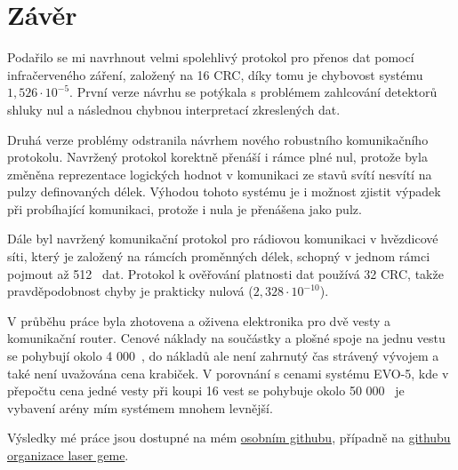 \chapter{Závěr}

Podařilo se mi navrhnout velmi spolehlivý protokol pro přenos dat pomocí infračerveného záření, založený na 16 CRC, díky tomu je chybovost systému $1,526 \cdot 10^{-5}$. První verze návrhu se potýkala s problémem zahlcování detektorů shluky nul a následnou chybnou interpretací zkreslených dat.

Druhá verze problémy odstranila návrhem nového robustního komunikačního protokolu. Navržený protokol korektně přenáší i rámce plné nul, protože byla změněna reprezentace logických hodnot v komunikaci ze stavů svítí nesvítí na pulzy definovaných délek. Výhodou tohoto systému je i možnost zjistit výpadek při probíhající komunikaci, protože i nula je přenášena jako pulz.

Dále byl navržený komunikační protokol pro rádiovou komunikaci v hvězdicové síti, který je založený na rámcích proměnných délek, schopný v jednom rámci pojmout až 512~ dat. Protokol k ověřování platnosti dat používá 32 CRC, takže pravděpodobnost chyby je prakticky nulová ($2,328 \cdot 10^{-10}$).

V průběhu práce byla zhotovena a oživena elektronika pro dvě vesty a komunikační router. Cenové náklady na součástky a plošné spoje na jednu vestu se pohybují okolo 4 000~, do nákladů ale není zahrnutý čas strávený vývojem a také není uvažována cena krabiček. V porovnání s cenami systému EVO-5, kde v přepočtu cena jedné vesty při koupi 16 vest se pohybuje okolo 50 000~ je vybavení arény mím systémem mnohem levnější.

Výsledky mé práce jsou dostupné na mém \href{https://github.com/wykys}{osobním githubu}, případně na \href{https://github.com/laser-game}{githubu organizace laser geme}.  
